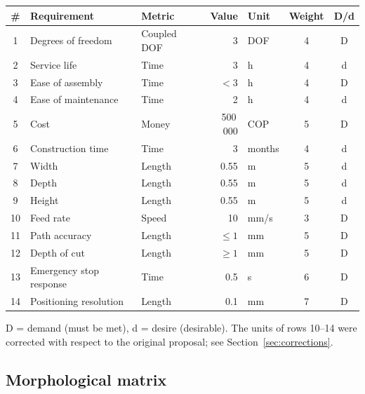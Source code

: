 \documentclass[11pt]{article}
\begin{document}
\begin{center}\small
\begin{tabular}{@{}cl l r l c c@{}}
\toprule
\textbf{\#} & \textbf{Requirement} & \textbf{Metric} & \textbf{Value} & \textbf{Unit} & \textbf{Weight} & \textbf{D/d} \\
\midrule
1  & Degrees of freedom      & Coupled DOF        & 3       & DOF        & 4 & D \\
2  & Service life            & Time               & 3       & h          & 4 & d \\
3  & Ease of assembly        & Time               & $<3$    & h          & 4 & D \\
4  & Ease of maintenance     & Time               & 2       & h          & 4 & d \\
5  & Cost                    & Money              & 500\,000& COP        & 5 & D \\
6  & Construction time       & Time               & 3       & months     & 4 & d \\
7  & Width                   & Length             & 0.55    & m          & 5 & d \\
8  & Depth                   & Length             & 0.55    & m          & 5 & d \\
9  & Height                  & Length             & 0.55    & m          & 5 & d \\
10 & Feed rate               & Speed              & 10      & mm/s       & 3 & D \\
11 & Path accuracy           & Length             & $\le 1$ & mm         & 5 & D \\
12 & Depth of cut            & Length             & $\ge 1$ & mm         & 5 & D \\
13 & Emergency stop response & Time               & 0.5     & s          & 6 & D \\
14 & Positioning resolution  & Length             & 0.1     & mm         & 7 & D \\
\bottomrule
\end{tabular}
\end{center}
{\footnotesize D = demand (must be met), d = desire (desirable). The units of rows 10--14
were corrected with respect to the original proposal; see
Section~\ref{sec:corrections}.}

\subsection{Morphological matrix}
\end{document}
